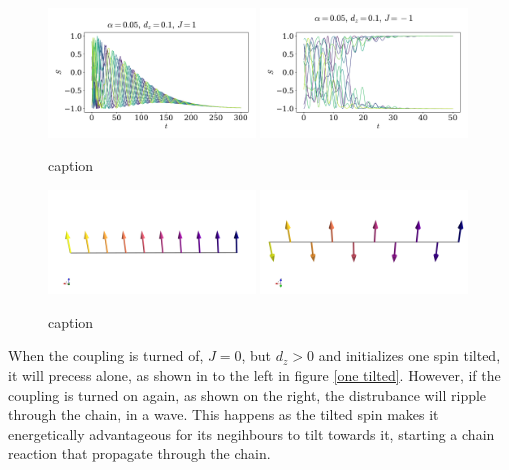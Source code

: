 \documentclass{article}
\begin{document}
    \begin{figure}
        \centering
        \includegraphics[width=0.49\textwidth]{../plots/ground_state_f.pdf}
        \includegraphics[width=0.49\textwidth]{../plots/ground_state_af.pdf}
        \caption{caption}
        \label{ground states}
    \end{figure}
    \begin{figure}
        \centering
        \includegraphics[width=0.49\textwidth]{../plots/ground_state_f3D.png}
        \includegraphics[width=0.49\textwidth]{../plots/ground_state_af3D.png}
        \caption{caption}
        \label{ground states 3D}
    \end{figure}

    When the coupling is turned of, $J = 0$, but $d_z>0$ and initializes one spin tilted, it will precess alone, as shown in to the left in figure \ref{one tilted}. However, if the coupling is turned on again, as shown on the right, the distrubance will ripple through the chain, in a wave. This happens as the tilted spin makes it energetically advantageous for its negihbours to tilt towards it, starting a chain reaction that propagate through the chain. 
\end{document}
